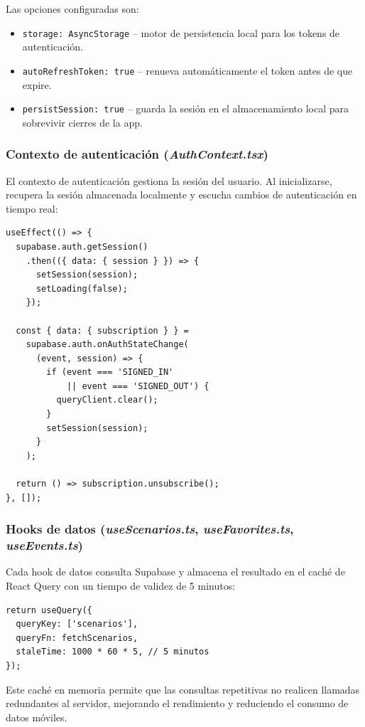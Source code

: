 Las opciones configuradas son:

\begin{itemize}
  \item \texttt{storage: AsyncStorage} -- motor de persistencia local
    para los tokens de autenticaci\'on.
  \item \texttt{autoRefreshToken: true} -- renueva autom\'aticamente
    el token antes de que expire.
  \item \texttt{persistSession: true} -- guarda la sesi\'on en el
    almacenamiento local para sobrevivir cierres de la app.
\end{itemize}

\subsubsection{Contexto de autenticaci\'on (\textit{AuthContext.tsx})}

El contexto de autenticaci\'on gestiona la sesi\'on del usuario. Al
inicializarse, recupera la sesi\'on almacenada localmente y escucha
cambios de autenticaci\'on en tiempo real:

\begin{lstlisting}
useEffect(() => {
  supabase.auth.getSession()
    .then(({ data: { session } }) => {
      setSession(session);
      setLoading(false);
    });

  const { data: { subscription } } =
    supabase.auth.onAuthStateChange(
      (event, session) => {
        if (event === 'SIGNED_IN'
            || event === 'SIGNED_OUT') {
          queryClient.clear();
        }
        setSession(session);
      }
    );

  return () => subscription.unsubscribe();
}, []);
\end{lstlisting}

\subsubsection{Hooks de datos (\textit{useScenarios.ts},
\textit{useFavorites.ts}, \textit{useEvents.ts})}

Cada hook de datos consulta Supabase y almacena el resultado en el
cach\'e de React Query con un tiempo de validez de 5 minutos:

\begin{lstlisting}
return useQuery({
  queryKey: ['scenarios'],
  queryFn: fetchScenarios,
  staleTime: 1000 * 60 * 5, // 5 minutos
});
\end{lstlisting}

Este cach\'e en memoria permite que las consultas repetitivas no
realicen llamadas redundantes al servidor, mejorando el rendimiento
y reduciendo el consumo de datos m\'oviles.
